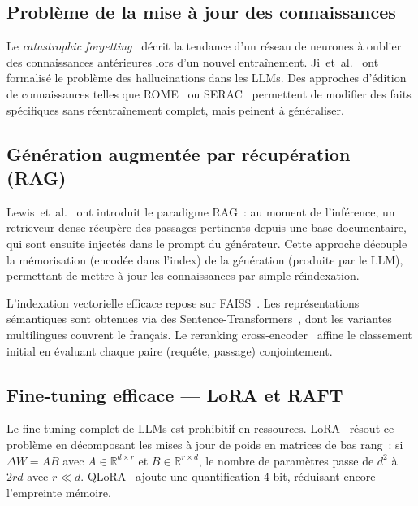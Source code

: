 \documentclass[10pt,journal,compsoc]{IEEEtran}
\begin{document}
\subsection{Problème de la mise à jour des connaissances}

Le \textit{catastrophic forgetting}~\cite{mccloskey1989catastrophic,
kirkpatrick2017overcoming} décrit la tendance d'un réseau de neurones
à oublier des connaissances antérieures lors d'un nouvel entraînement.
Ji~et~al.~\cite{ji2023hallucination} ont formalisé le problème des
hallucinations dans les LLMs. Des approches d'édition de connaissances
telles que ROME~\cite{meng2022locating} ou
SERAC~\cite{mitchell2022memory} permettent de modifier des faits
spécifiques sans réentraînement complet, mais peinent à généraliser.

\subsection{Génération augmentée par récupération (RAG)}

Lewis~et~al.~\cite{lewis2020rag} ont introduit le paradigme RAG~:
au moment de l'inférence, un retrieveur dense récupère des passages
pertinents depuis une base documentaire, qui sont ensuite injectés
dans le prompt du générateur. Cette approche découple la mémorisation
(encodée dans l'index) de la génération (produite par le LLM),
permettant de mettre à jour les connaissances par simple réindexation.

L'indexation vectorielle efficace repose sur FAISS~\cite{johnson2019faiss}.
Les représentations sémantiques sont obtenues via des
Sentence-Transformers~\cite{reimers2019sentencebert}, dont les variantes
multilingues couvrent le français. Le reranking
cross-encoder~\cite{nogueira2019passage} affine le classement initial
en évaluant chaque paire (requête, passage) conjointement.

\subsection{Fine-tuning efficace --- LoRA et RAFT}

Le fine-tuning complet de LLMs est prohibitif en ressources.
LoRA~\cite{hu2022lora} résout ce problème en décomposant les mises à
jour de poids en matrices de bas rang~: si $\Delta W = AB$ avec
$A \in \mathbb{R}^{d \times r}$ et $B \in \mathbb{R}^{r \times d}$,
le nombre de paramètres passe de $d^2$ à $2rd$ avec $r \ll d$.
QLoRA~\cite{dettmers2023qlora} ajoute une quantification 4-bit,
réduisant encore l'empreinte mémoire.
\end{document}
